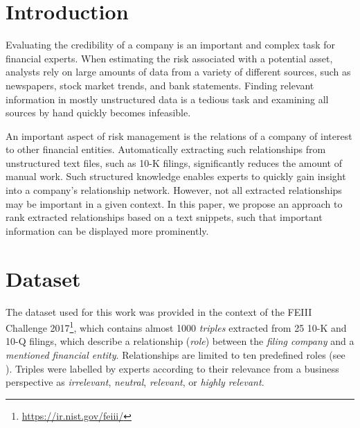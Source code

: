 \section{Introduction}

Evaluating the credibility of a company is an important and complex task for financial experts.
When estimating the risk associated with a potential asset, analysts rely on large amounts of data from a variety of different sources, such as newspapers, stock market trends, and bank statements.
Finding relevant information in mostly unstructured data is a tedious task and examining all sources by hand quickly becomes infeasible.

An important aspect of risk management is the relations of a company of interest to other financial entities.
Automatically extracting such relationships from unstructured text files, such as 10-K filings, significantly reduces the amount of manual work.
Such structured knowledge enables experts to quickly gain insight into a company's relationship network.
However, not all extracted relationships may be important in a given context.
In this paper, we propose an approach to rank extracted relationships based on a text snippets, such that important information can be displayed more prominently.

\section{Dataset}
The dataset used for this work was provided in the context of the FEIII Challenge 2017\footnote{\url{https://ir.nist.gov/feiii/}}, which contains almost 1000 \emph{triples} extracted from 25 10-K and 10-Q filings, which describe a relationship (\emph{role}) between the \emph{filing company} and a \emph{mentioned financial entity}.
Relationships are limited to ten predefined roles (see ).
Triples were labelled by experts according to their relevance from a business perspective as \emph{irrelevant}, \emph{neutral}, \emph{relevant}, or \emph{highly relevant}.

